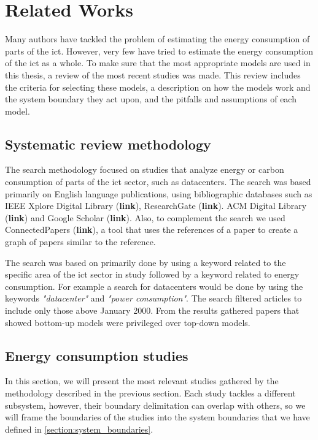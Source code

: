 \chapter{Related Works}
\label{chapter:related_works}

\begin{introduction}
    Many authors have tackled the problem of estimating the energy consumption of parts of the \ac{ict}. However, very few have tried to estimate the energy consumption of the \ac{ict} as a whole. To make sure that the most appropriate models are used in this thesis, a review of the most recent studies was made. This review includes the criteria for selecting these models, a description on how the models work and the system boundary they act upon, and the pitfalls and assumptions of each model.
\end{introduction}

\section{Systematic review methodology}

The search methodology focused on studies that analyze energy or carbon consumption of parts of the \ac{ict} sector, such as datacenters. The search was based primarily on English language publications, using bibliographic databases such as IEEE Xplore Digital Library (\textbf{link}), ResearchGate (\textbf{link}). ACM Digital Library (\textbf{link}) and Google Scholar (\textbf{link}). Also, to complement the search we used ConnectedPapers (\textbf{link}), a tool that uses the references of a paper to create a graph of papers similar to the reference.

The search was based on primarily done by using a keyword related to the specific area of the \ac{ict} sector in study followed by a keyword related to energy consumption. For example a search for datacenters would be done by using the keywords \textit{"datacenter"} and \textit{"power consumption"}. The search filtered articles to include only those above January 2000. 
From the results gathered papers that showed bottom-up models were privileged over top-down models. 

\section{Energy consumption studies}

In this section, we will present the most relevant studies gathered by the methodology described in the previous section. Each study tackles a different subsystem, however, their boundary delimitation can overlap with others, so we will frame the boundaries of the studies into the system boundaries that we have defined in \ref{section:system_boundaries}.

